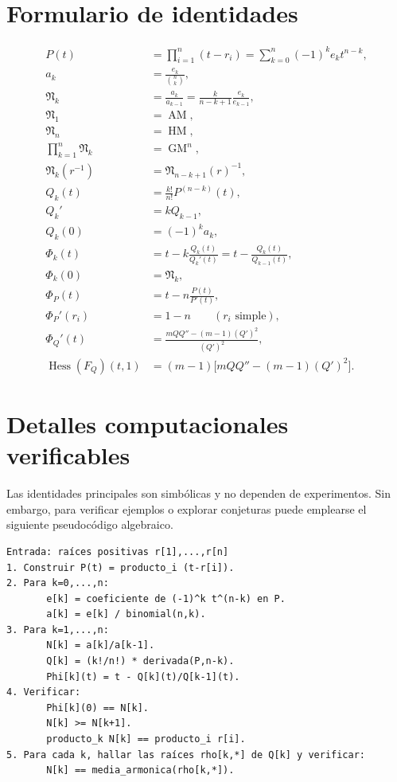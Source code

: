 \documentclass[11pt,oneside]{scrartcl}
\theoremstyle{plainblue}
\theoremstyle{definitionblue}
\theoremstyle{remarkgray}
\newcommand{\Hess}{\operatorname{Hess}}
\newcommand{\AM}{\operatorname{AM}}
\newcommand{\GM}{\operatorname{GM}}
\newcommand{\HM}{\operatorname{HM}}
\newcommand{\cN}{\mathfrak{N}}
\begin{document}
\FloatBarrier
\appendix
\section{Formulario de identidades}

\begin{align*}
P(t)&=\prod_{i=1}^{n}(t-r_i)
=\sum_{k=0}^{n}(-1)^ke_kt^{n-k},\\
a_k&=\frac{e_k}{\binom nk},\\
\cN_k&=\frac{a_k}{a_{k-1}}
=\frac{k}{n-k+1}\frac{e_k}{e_{k-1}},\\
\cN_1&=\AM,\\
\cN_n&=\HM,\\
\prod_{k=1}^{n}\cN_k&=\GM^n,\\
\cN_k(r^{-1})&=\cN_{n-k+1}(r)^{-1},\\
Q_k(t)&=\frac{k!}{n!}P^{(n-k)}(t),\\
Q_k'&=kQ_{k-1},\\
Q_k(0)&=(-1)^ka_k,\\
\Phi_k(t)&=t-k\frac{Q_k(t)}{Q_k'(t)}
=t-\frac{Q_k(t)}{Q_{k-1}(t)},\\
\Phi_k(0)&=\cN_k,\\
\Phi_P(t)&=t-n\frac{P(t)}{P'(t)},\\
\Phi_P'(r_i)&=1-n\qquad(r_i\text{ simple}),\\
\Phi_Q'(t)&=\frac{mQQ''-(m-1)(Q')^2}{(Q')^2},\\
\Hess(F_Q)(t,1)&=(m-1)\bigl[mQQ''-(m-1)(Q')^2\bigr].
\end{align*}

\section{Detalles computacionales verificables}

Las identidades principales son simbólicas y no dependen de experimentos. Sin
embargo, para verificar ejemplos o explorar conjeturas puede emplearse el siguiente
pseudocódigo algebraico.

\begin{verbatim}
Entrada: raíces positivas r[1],...,r[n]
1. Construir P(t) = producto_i (t-r[i]).
2. Para k=0,...,n:
       e[k] = coeficiente de (-1)^k t^(n-k) en P.
       a[k] = e[k] / binomial(n,k).
3. Para k=1,...,n:
       N[k] = a[k]/a[k-1].
       Q[k] = (k!/n!) * derivada(P,n-k).
       Phi[k](t) = t - Q[k](t)/Q[k-1](t).
4. Verificar:
       Phi[k](0) == N[k].
       N[k] >= N[k+1].
       producto_k N[k] == producto_i r[i].
5. Para cada k, hallar las raíces rho[k,*] de Q[k] y verificar:
       N[k] == media_armonica(rho[k,*]).
\end{verbatim}
\end{document}
